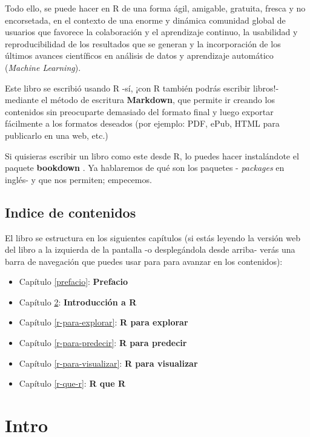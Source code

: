 \documentclass[]{book}
\theoremstyle{definition}
\theoremstyle{definition}
\theoremstyle{remark}
\begin{document}
Todo ello, se puede hacer en R de una forma ágil, amigable, gratuita,
fresca y no encorsetada, en el contexto de una enorme y dinámica
comunidad global de usuarios que favorece la colaboración y el
aprendizaje continuo, la usabilidad y reproducibilidad de los resultados
que se generan y la incorporación de los últimos avances científicos en
análisis de datos y aprendizaje automático (\emph{Machine Learning}).

Este libro se escribió usando R -sí, ¡con R también podrás escribir
libros!- mediante el método de escritura \textbf{Markdown}, que permite
ir creando los contenidos sin preocuparte demasiado del formato final y
luego exportar fácilmente a los formatos deseados (por ejemplo: PDF,
ePub, HTML para publicarlo en una web, etc.)

Si quisieras escribir un libro como este desde R, lo puedes hacer
instalándote el paquete \textbf{bookdown} \citep{R-bookdown}. Ya
hablaremos de qué son los paquetes - \emph{packages} en inglés- y que
nos permiten; empecemos.

\section{Indice de contenidos}\label{indice-de-contenidos}

El libro se estructura en los siguientes capítulos (si estás leyendo la
versión web del libro a la izquierda de la pantalla -o desplegándola
desde arriba- verás una barra de navegación que puedes usar para para
avanzar en los contenidos):

\begin{itemize}
\item
  Capítulo \ref{prefacio}: \textbf{Prefacio}
\item
  Capítulo \ref{intro}: \textbf{Introducción a R}
\item
  Capítulo \ref{r-para-explorar}: \textbf{R para explorar}
\item
  Capítulo \ref{r-para-predecir}: \textbf{R para predecir}
\item
  Capítulo \ref{r-para-visualizar}: \textbf{R para visualizar}
\item
  Capítulo \ref{r-que-r}: \textbf{R que R}
\end{itemize}

\chapter{Intro}\label{intro}
\end{document}
